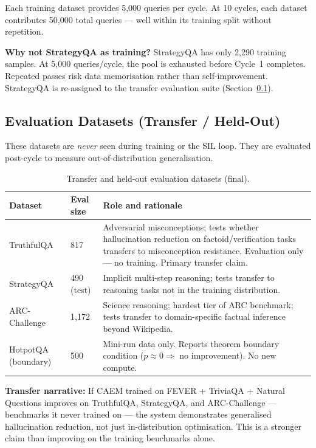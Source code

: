 \documentclass[12pt,a4paper]{article}
\newcommand{\caem}{CAEM}
\begin{document}
Each training dataset provides 5,000 queries per cycle.
At 10 cycles, each dataset contributes 50,000 total queries --- well within its
training split without repetition.

\textbf{Why not StrategyQA as training?}
StrategyQA has only 2,290 training samples.
At 5,000 queries/cycle, the pool is exhausted before Cycle~1 completes.
Repeated passes risk data memorisation rather than self-improvement.
StrategyQA is re-assigned to the transfer evaluation suite
(Section~\ref{sec:eval-datasets}).

\subsection{Evaluation Datasets (Transfer / Held-Out)}
\label{sec:eval-datasets}

These datasets are \emph{never} seen during training or the SIL loop.
They are evaluated post-cycle to measure out-of-distribution generalisation.

\begin{table}[htbp]
\centering
\caption{Transfer and held-out evaluation datasets (final).}
\label{tab:eval-datasets}
\renewcommand{\arraystretch}{1.3}
\begin{tabular}{@{}p{2.8cm}p{1.6cm}p{6.8cm}@{}}
\toprule
\textbf{Dataset} & \textbf{Eval size} & \textbf{Role and rationale} \\
\midrule
TruthfulQA & 817 & Adversarial misconceptions; tests whether hallucination
  reduction on factoid/verification tasks transfers to misconception resistance.
  Evaluation only --- no training. Primary transfer claim. \\
StrategyQA & 490 (test) & Implicit multi-step reasoning; tests transfer to
  reasoning tasks not in the training distribution. \\
ARC-Challenge & 1,172 & Science reasoning; hardest tier of ARC benchmark;
  tests transfer to domain-specific factual inference beyond Wikipedia. \\
HotpotQA (boundary) & 500 & Mini-run data only. Reports theorem boundary
  condition ($p \approx 0 \Rightarrow$ no improvement). No new compute. \\
\bottomrule
\end{tabular}
\end{table}

\textbf{Transfer narrative:}
If \caem{} trained on FEVER + TriviaQA + Natural Questions improves on
TruthfulQA, StrategyQA, and ARC-Challenge --- benchmarks it never trained on ---
the system demonstrates generalised hallucination reduction, not just
in-distribution optimisation.
This is a stronger claim than improving on the training benchmarks alone.
\end{document}
